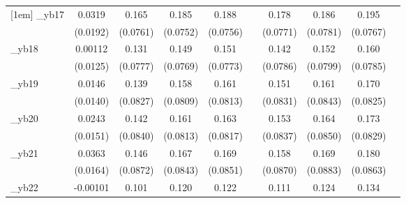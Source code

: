 \begin{table}[htbp]
\begin{tabular}{l*{9}{c}}
[1em]
\_yb17       &      0.0319\sym{*}  &       0.165\sym{**} &       0.185\sym{**} &       0.188\sym{**} &                     &       0.178\sym{**} &       0.186\sym{**} &       0.195\sym{**} &                     \\
            &    (0.0192)         &    (0.0761)         &    (0.0752)         &    (0.0756)         &                     &    (0.0771)         &    (0.0781)         &    (0.0767)         &                     \\
[1em]
\_yb18       &     0.00112         &       0.131\sym{*}  &       0.149\sym{*}  &       0.151\sym{*}  &                     &       0.142\sym{*}  &       0.152\sym{*}  &       0.160\sym{**} &                     \\
            &    (0.0125)         &    (0.0777)         &    (0.0769)         &    (0.0773)         &                     &    (0.0786)         &    (0.0799)         &    (0.0785)         &                     \\
[1em]
\_yb19       &      0.0146         &       0.139\sym{*}  &       0.158\sym{*}  &       0.161\sym{**} &                     &       0.151\sym{*}  &       0.161\sym{*}  &       0.170\sym{**} &                     \\
            &    (0.0140)         &    (0.0827)         &    (0.0809)         &    (0.0813)         &                     &    (0.0831)         &    (0.0843)         &    (0.0825)         &                     \\
[1em]
\_yb20       &      0.0243         &       0.142\sym{*}  &       0.161\sym{**} &       0.163\sym{**} &                     &       0.153\sym{*}  &       0.164\sym{*}  &       0.173\sym{**} &                     \\
            &    (0.0151)         &    (0.0840)         &    (0.0813)         &    (0.0817)         &                     &    (0.0837)         &    (0.0850)         &    (0.0829)         &                     \\
[1em]
\_yb21       &      0.0363\sym{**} &       0.146\sym{*}  &       0.167\sym{**} &       0.169\sym{**} &                     &       0.158\sym{*}  &       0.169\sym{*}  &       0.180\sym{**} &                     \\
            &    (0.0164)         &    (0.0872)         &    (0.0843)         &    (0.0851)         &                     &    (0.0870)         &    (0.0883)         &    (0.0863)         &                     \\
[1em]
\_yb22       &    -0.00101         &       0.101         &       0.120         &       0.122         &                     &       0.111         &       0.124         &       0.134         &                     \\

\end{tabular}
\end{table}

